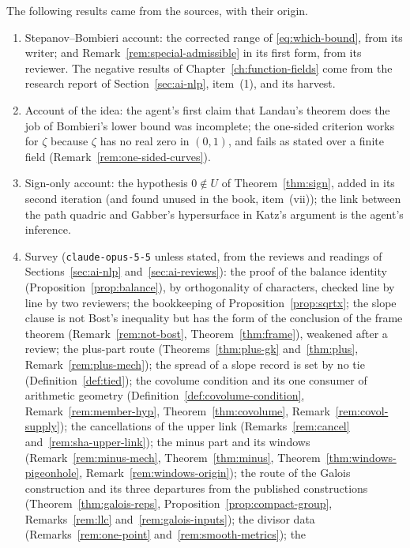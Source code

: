 \documentclass[11pt]{amsbook}
\theoremstyle{plain}
\theoremstyle{definition}
\theoremstyle{remark}
\numberwithin{equation}{section}
\numberwithin{figure}{chapter}
\numberwithin{table}{chapter}
\begin{document}
The following results came from the sources, with their origin.
\begin{enumerate}[label=(\roman*),resume]
\item Stepanov--Bombieri account: the corrected range of
\eqref{eq:which-bound}, from its writer; and
Remark~\ref{rem:special-admissible} in its first form, from its
reviewer. The negative results of Chapter~\ref{ch:function-fields}
come from the research report of
Section~\ref{sec:ai-nlp}, item~(1), and its harvest.
\item Account of the idea: the agent's first claim that Landau's
theorem does the job of Bombieri's lower bound was incomplete; the
one-sided criterion works for $\zeta$ because $\zeta$ has no real zero
in $(0,1)$, and fails as stated over a finite field
(Remark~\ref{rem:one-sided-curves}).
\item Sign-only account: the hypothesis $0\notin U$ of
Theorem~\ref{thm:sign}, added in its second iteration (and found
unused in the book, item~(vii)); the link
between the path quadric and Gabber's hypersurface in Katz's argument
\cite{Katz2015} is the agent's inference.
\item Survey (\texttt{claude-opus-5-5} unless stated, from the reviews
and readings of Sections~\ref{sec:ai-nlp} and~\ref{sec:ai-reviews}):
the proof of the balance identity (Proposition~\ref{prop:balance}), by
orthogonality of characters, checked line by line by two reviewers;
the bookkeeping of Proposition~\ref{prop:sqrtx}; the slope clause is
not Bost's inequality but has the form of the conclusion of the frame
theorem (Remark~\ref{rem:not-bost}, Theorem~\ref{thm:frame}), weakened
after a review; the plus-part route
(Theorems~\ref{thm:plus-gk} and~\ref{thm:plus},
Remark~\ref{rem:plus-mech}); the spread of a slope record is set by
no tie (Definition~\ref{def:tied}); the covolume condition and its
one consumer of arithmetic geometry
(Definition~\ref{def:covolume-condition},
Remark~\ref{rem:member-hyp}, Theorem~\ref{thm:covolume},
Remark~\ref{rem:covol-supply}); the cancellations of the upper link
(Remarks~\ref{rem:cancel} and~\ref{rem:sha-upper-link}); the minus
part and its windows (Remark~\ref{rem:minus-mech},
Theorem~\ref{thm:minus}, Theorem~\ref{thm:windows-pigeonhole},
Remark~\ref{rem:windows-origin}); the route of the Galois construction
and its three departures from the published constructions
(Theorem~\ref{thm:galois-reps}, Proposition~\ref{prop:compact-group},
Remarks~\ref{rem:llc} and~\ref{rem:galois-inputs}); the divisor data
(Remarks~\ref{rem:one-point} and~\ref{rem:smooth-metrics}); the

\end{enumerate}
\end{document}
